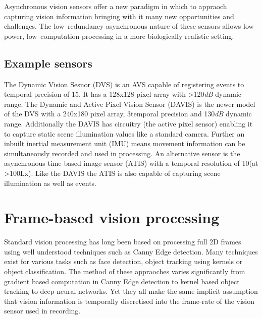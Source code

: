 Asynchronous vision sensors offer a new paradigm in which to appraoch capturing vision information bringing with it many new opportunities and challenges. 
The low--redundancy asynchronous nature of these sensors allows low--power, low--computation processing in a more biologically realistic setting.



\subsection{Example sensors}
The Dynamic Vision Sesnor (DVS) is an AVS capable of registering events to temporal precision of 15\us\cite{delbruck2008}. 
It has a 128x128 pixel array with \textgreater 120\textit{dB} dynamic range.
The Dynamic and Active Pixel Vision Sensor (DAVIS) is the newer model of the DVS with a 240x180 pixel array, 3\us temporal precision and 130\textit{dB} dynamic range\cite{DAVIS}. 
Additionally the DAVIS has circuitry (the active pixel sensor) enabling it to capture static scene illumination values like a standard camera.
Further an inbuilt inertial measurement unit (IMU) means movement information can be simultaneously recorded and used in processing. 
An alternative sensor is the asynchronous time-based image sensor (ATIS) with a temporal resolution of 10\us (at \textgreater100Lx)\cite{posch2011qvga}.
Like the DAVIS the ATIS is also capable of capturing scene illumination as well as events.  





\section{Frame-based vision processing}   %

Standard vision processing has long been based on processing full 2D frames using well understood techniques such as Canny Edge detection\cite{canny1986computational}. 
Many techniques exist for various tasks such as face detection\cite{viola2004robust}, object tracking using kernels\cite{comaniciu2003kernel} or object classification\cite{krizhevsky2012imagenet}.
The method of these appraoches varies significantly from gradient based computation in Canny Edge detection to kernel based object tracking to deep neural networks.
Yet they all make the same implicit assumption that vision information is temporally discretised into the frame-rate of the vision sensor used in recording. 

